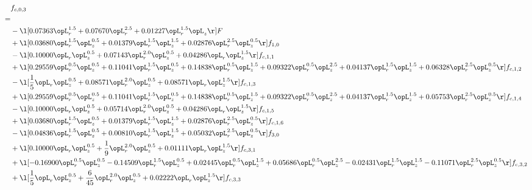 \begin{alignat}{2} 
\label{eq:f_03_1} 
& f_{c,0,3} \nonumber \\ 
 = \\ 
& - \l[  0.07363 \opL_r^{1.5} +  0.07670 \opL_r^{2.5} +  0.01227 \opL_r^{1.5} \opL_z  \r] F \nonumber \\ 
& + \l[  0.03680 \opL_r^{1.5} \opL_z^{0.5} +  0.01379 \opL_r^{1.5} \opL_z^{1.5} +  0.02876 \opL_r^{2.5} \opL_z^{0.5}  \r] f_{1,0} \nonumber \\ 
& - \l[  0.10000 \opL_r \opL_z^{0.5} +  0.07143 \opL_r^{2.0} \opL_z^{0.5} +  0.04286 \opL_r \opL_z^{1.5}  \r] f_{c,1,1} \nonumber \\ 
& + \l[  0.29559 \opL_r^{0.5} \opL_z^{0.5} +  0.11041 \opL_r^{1.5} \opL_z^{0.5} +  0.14838 \opL_r^{0.5} \opL_z^{1.5} +  0.09322 \opL_r^{0.5} \opL_z^{2.5} +  0.04137 \opL_r^{1.5} \opL_z^{1.5} +  0.06328 \opL_r^{2.5} \opL_z^{0.5}  \r] f_{c,1,2} \nonumber \\ 
& - \l[ \frac{1}{5} \opL_r \opL_z^{0.5} +  0.08571 \opL_r^{2.0} \opL_z^{0.5} +  0.08571 \opL_r \opL_z^{1.5}  \r] f_{c,1,3} \nonumber \\ 
& + \l[  0.29559 \opL_r^{0.5} \opL_z^{0.5} +  0.11041 \opL_r^{1.5} \opL_z^{0.5} +  0.14838 \opL_r^{0.5} \opL_z^{1.5} +  0.09322 \opL_r^{0.5} \opL_z^{2.5} +  0.04137 \opL_r^{1.5} \opL_z^{1.5} +  0.05753 \opL_r^{2.5} \opL_z^{0.5}  \r] f_{c,1,4} \nonumber \\ 
& - \l[  0.10000 \opL_r \opL_z^{0.5} +  0.05714 \opL_r^{2.0} \opL_z^{0.5} +  0.04286 \opL_r \opL_z^{1.5}  \r] f_{c,1,5} \nonumber \\ 
& + \l[  0.03680 \opL_r^{1.5} \opL_z^{0.5} +  0.01379 \opL_r^{1.5} \opL_z^{1.5} +  0.02876 \opL_r^{2.5} \opL_z^{0.5}  \r] f_{c,1,6} \nonumber \\ 
& - \l[  0.04836 \opL_r^{1.5} \opL_z^{0.5} +  0.00810 \opL_r^{1.5} \opL_z^{1.5} +  0.05032 \opL_r^{2.5} \opL_z^{0.5}  \r] f_{3,0} \nonumber \\ 
& + \l[  0.10000 \opL_r \opL_z^{0.5} + \frac{1}{9} \opL_r^{2.0} \opL_z^{0.5} +  0.01111 \opL_r \opL_z^{1.5}  \r] f_{c,3,1} \nonumber \\ 
& + \l[  -0.16900 \opL_r^{0.5} \opL_z^{0.5}   -0.14509 \opL_r^{1.5} \opL_z^{0.5} +  0.02445 \opL_r^{0.5} \opL_z^{1.5} +  0.05686 \opL_r^{0.5} \opL_z^{2.5}   -0.02431 \opL_r^{1.5} \opL_z^{1.5}   -0.11071 \opL_r^{2.5} \opL_z^{0.5}  \r] f_{c,3,2} \nonumber \\ 
& + \l[ \frac{1}{5} \opL_r \opL_z^{0.5} + \frac{6}{45} \opL_r^{2.0} \opL_z^{0.5} +  0.02222 \opL_r \opL_z^{1.5}  \r] f_{c,3,3} \nonumber \\ 

\end{alignat}
